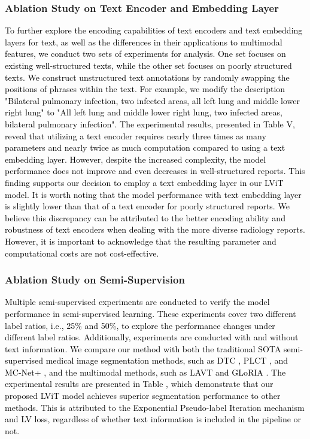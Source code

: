 \documentclass[lettersize,journal]{IEEEtran}
\begin{document}
\subsubsection{Ablation Study on Text Encoder and Embedding Layer}
\textcolor{black}{
To further explore the encoding capabilities of text encoders and text embedding layers for text, as well as the differences in their applications to multimodal features, we conduct two sets of experiments for analysis. One set focuses on existing well-structured texts, while the other set focuses on poorly structured texts. We construct unstructured text annotations by randomly swapping the positions of phrases within the text. For example, we modify the description "Bilateral pulmonary infection, two infected areas, all left lung and middle lower right lung" to "All left lung and middle lower right lung, two infected areas, bilateral pulmonary infection". The experimental results, presented in Table V, reveal that utilizing a text encoder requires nearly three times as many parameters and nearly twice as much computation compared to using a text embedding layer. However, despite the increased complexity, the model performance does not improve and even decreases in well-structured reports. This finding supports our decision to employ a text embedding layer in our LViT model.  It is worth noting that the model performance with text embedding layer is slightly lower than  that of a text encoder for poorly structured reports. 
We believe this discrepancy can be attributed to the better encoding ability and robustness of text encoders when dealing with the more diverse radiology reports. However, it is important to acknowledge that the resulting parameter and computational costs are not cost-effective.}

\subsubsection{Ablation Study on Semi-Supervision}

\textcolor{black}{
Multiple semi-supervised experiments are conducted to verify the model performance in semi-supervised learning. These experiments cover two different label ratios, i.e., 25\% and 50\%, to explore the performance changes under different label ratios. Additionally, experiments are conducted with and without text information. We compare our method with both the traditional SOTA semi-supervised medical image segmentation methods, such as DTC \cite{luo2021semi}, PLCT \cite{chaitanya2023local}, and MC-Net+ \cite{wu2022mutual}, and the multimodal methods, such as LAVT \cite{Yang22CVPR} and GLoRIA \cite{huang2021gloria}.  The experimental results are presented in Table \uppercase\expandafter{}, which demonstrate that our proposed LViT model achieves superior segmentation performance to other methods. This is attributed to the Exponential Pseudo-label Iteration mechanism and LV loss, regardless of whether text information is included in the pipeline or not.
}
\end{document}
